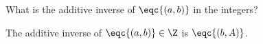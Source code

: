 

What is the additive inverse of $\eqc{(a, b)}$ in the integers?


\begin{proposition}
  The additive inverse of $\eqc{(a, b)} \in \Z$ is $\eqc{(b, A)}$.
\end{proposition}
